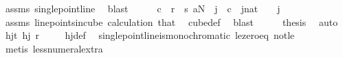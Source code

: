 \begin{isabellebody}
\ assms{\isacharparenleft}{\kern0pt}{}{\isacharparenright}{\kern0pt}\ single{\isacharunderscore}{\kern0pt}point{\isacharunderscore}{\kern0pt}line\ \isamarkupfalse%
\ blast\isanewline
\ \ \isamarkupfalse%
\ \isamarkupfalse%
\ {\isachardoublequoteopen}{\isasymexists}c\ {\isacharless}{\kern0pt}\ r{\isachardot}{\kern0pt}\ {\isasymchi}\ {\isacharparenleft}{\kern0pt}{\isacharparenleft}{\kern0pt}{\isasymlambda}s{\isasymin}{\isacharbraceleft}{\kern0pt}{\isachardot}{\kern0pt}{\isachardot}{\kern0pt}{\isacharless}{\kern0pt}{}{\isacharbraceright}{\kern0pt}{\isachardot}{\kern0pt}\ {\isasymlambda}a{\isasymin}{\isacharbraceleft}{\kern0pt}{\isachardot}{\kern0pt}{\isachardot}{\kern0pt}{\isacharless}{\kern0pt}N{\isacharbraceright}{\kern0pt}{\isachardot}{\kern0pt}\ {}{\isacharparenright}{\kern0pt}\ j{\isacharparenright}{\kern0pt}\ {\isacharequal}{\kern0pt}\ c{\isachardoublequoteclose}\ \ {\isachardoublequoteopen}{\isacharparenleft}{\kern0pt}j{\isacharcolon}{\kern0pt}{\isacharcolon}{\kern0pt}nat{\isacharparenright}{\kern0pt}\ {\isacharless}{\kern0pt}\ {}{\isachardoublequoteclose}\ \ j\ \isamarkupfalse%
\ assms\ line{\isacharunderscore}{\kern0pt}points{\isacharunderscore}{\kern0pt}in{\isacharunderscore}{\kern0pt}cube\ calculation\ that\ \isamarkupfalse%
\ cube{\isacharunderscore}{\kern0pt}def\ \isamarkupfalse%
\ blast\isanewline
\ \ \isamarkupfalse%
\ \isamarkupfalse%
\ {\isacharquery}{\kern0pt}thesis\ \isamarkupfalse%
\ auto\isanewline
{}\isamarkupfalse%
%
\endisatagproof
{\isafoldproof}%
%
\isadelimproof
\isanewline
%
\endisadelimproof
\isanewline
{}\isamarkupfalse%
\ hj{\isacharunderscore}{\kern0pt}t{\isacharunderscore}{\kern0pt}{}{\isacharcolon}{\kern0pt}\ {\isachardoublequoteopen}hj\ r\ {}{\isachardoublequoteclose}\isanewline
%
\isadelimproof
\ \ %
\endisadelimproof
%
\isatagproof
{}\isamarkupfalse%
\ hj{\isacharunderscore}{\kern0pt}def\ \isamarkupfalse%
\ single{\isacharunderscore}{\kern0pt}point{\isacharunderscore}{\kern0pt}line{\isacharunderscore}{\kern0pt}is{\isacharunderscore}{\kern0pt}monochromatic\ le{\isacharunderscore}{\kern0pt}zero{\isacharunderscore}{\kern0pt}eq\ not{\isacharunderscore}{\kern0pt}le\isanewline
\ \ \isamarkupfalse%
\ {\isacharparenleft}{\kern0pt}metis\ less{\isacharunderscore}{\kern0pt}numeral{\isacharunderscore}{\kern0pt}extra{\isacharparenleft}{\kern0pt}{}{\isacharparenright}{\kern0pt}{\isacharparenright}{\kern0pt}%

\end{isabellebody}
